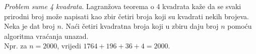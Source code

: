     



\begin{example}
	\textit{Problem sume 4 kvadrata}. Lagranžova teorema o 4 kvadrata kaže da se svaki prirodni broj može napisati kao zbir četiri broja koji su kvadrati nekih brojeva. Neka je dat broj $n$. Naći četiri kvadratna broja koji u zbiru daju broj $n$ pomoću algoritma vraćanja unazad. \\
	Npr. za $n=2000$, vrijedi $1764 + 196 + 36 + 4 = 2000. $
\end{example}


